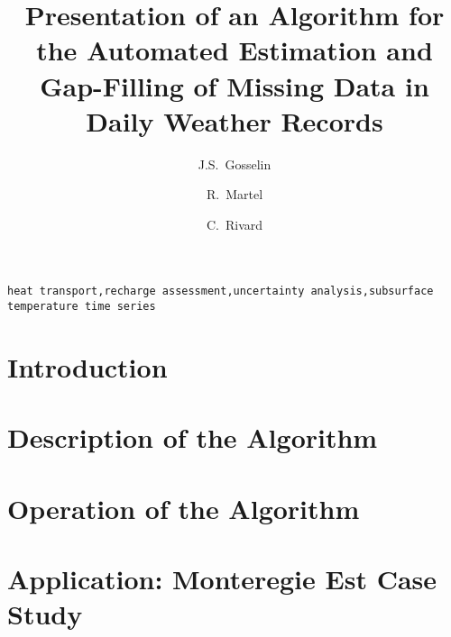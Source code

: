 \documentclass[3p, times, review]{elsarticle} %
\begin{document}
\begin{frontmatter}

\title{Presentation of an Algorithm for the Automated Estimation and Gap-Filling of Missing Data in Daily Weather Records}

\author[inrs]{J.S.~Gosselin}

\author[inrs]{R.~Martel}

\author[cgc]{C.~Rivard}


\address[inrs]{Institut national de la recherche scientifique, Centre Eau Terre Environnement,
490 rue de la Couronne, Quebec City, Quebec, Canada}
\address[cgc]{Geological Survey of Canada, Quebec Division, 490 rue de la Couronne, Quebec City, Quebec, Canada}

\begin{abstract}
	\vspace{-1em}
	
\end{abstract}

\begin{keyword}
\texttt{heat transport\sep recharge assessment\sep uncertainty analysis\sep subsurface temperature time series}
\end{keyword}

\end{frontmatter}

\linenumbers

\section{Introduction}
    

\section{Description of the Algorithm}\label{sec:Theory}
    
    
\section{Operation of the Algorithm}\label{sec:Howto}
    
    
\section{Application: Monteregie Est Case Study}\label{sec:MontEstCaseStudy}
    
\end{document}
